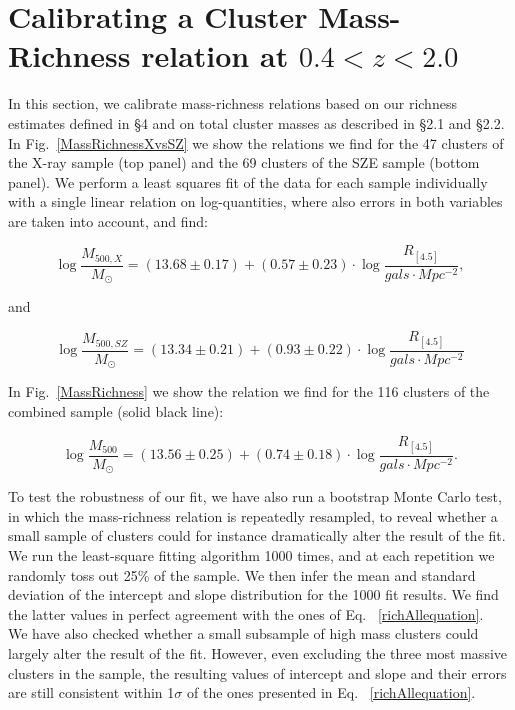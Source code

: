 \documentclass[apj,twocolumn]{emulateapj}
\begin{document}
{\section{Calibrating a Cluster Mass-Richness relation at $0.4<z<2.0$}

In this section, we calibrate mass-richness relations based on our richness estimates defined in \S 4 and on total cluster masses as described in \S 2.1 and \S 2.2. In Fig.~\ref{MassRichnessXvsSZ} we show the relations we find for the 47 clusters of the X-ray sample (top panel) and the 69 clusters of the SZE sample (bottom panel).  We perform a least squares fit of the data for each sample individually with a single linear relation on log-quantities, where also errors in both variables are taken into account, and find:

\begin{equation}
\log \frac{M_{500,X}}{M_{\odot}}= (13.68 \pm 0.17) + (0.57 \pm 0.23) \cdot \log \frac{R_{[4.5]}}{gals \cdot Mpc^{-2}},
\label{richXequation}
\end{equation}

and

\begin{equation}
\log \frac{M_{500,SZ}}{M_{\odot}}= (13.34 \pm 0.21) + (0.93 \pm 0.22) \cdot \log \frac{R_{[4.5]}}{gals \cdot Mpc^{-2}}
\label{richYZequation}
\end{equation}

In Fig.~\ref{MassRichness} we show the relation we find for the 116 clusters of the combined sample (solid black line):

\begin{equation}
\log \frac{M_{{500}}}{M_{\odot}}= (13.56 \pm 0.25) + (0.74 \pm 0.18) \cdot \log \frac{R_{[4.5]}}{gals \cdot Mpc^{-2}}.
\label{richAllequation}
\end{equation}

To test the robustness of our fit, we have also run a bootstrap Monte Carlo test, in which the mass-richness relation is repeatedly resampled, 
to reveal whether a small sample of clusters could for instance dramatically alter the result of the fit. We run the least-square fitting algorithm 1000 times, and at each repetition we randomly toss out 25\% of the sample. We then infer the mean and standard deviation of the intercept and slope distribution for the 1000 fit results. We find the latter values in perfect agreement with the ones of Eq. ~\ref{richAllequation}.\\
We have also checked whether a small subsample of high mass clusters could largely alter the result of the fit. However, even excluding the three most massive clusters in the sample, the resulting values of intercept and slope and their errors are still consistent within 1$\sigma$ of the ones presented in Eq. ~\ref{richAllequation}.

}
\end{document}
